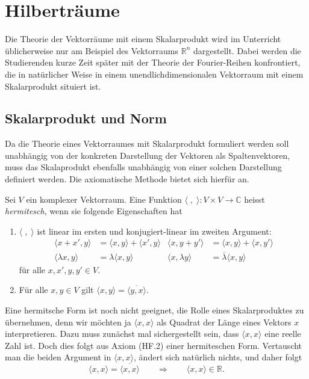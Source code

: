 %
%
%
\chapter{Hilberträume
\label{chapter:hilbertspaces}}
\rhead{}
Die Theorie der Vektorräume mit einem Skalarprodukt wird im Unterricht
üblicherweise nur am Beispiel des Vektorraums $\mathbb R^n$ dargestellt.
Dabei werden die Studierenden kurze Zeit später mit der Theorie
der Fourier-Reihen konfrontiert, die in natürlicher Weise in einem
unendlichdimensionalen Vektorraum mit einem Skalarprodukt situiert ist.

\section{Skalarprodukt und Norm}
Da die Theorie eines Vektorraumes mit Skalarprodukt formuliert werden
soll unabhängig von der konkreten Darstellung der Vektoren als 
Spaltenvektoren, muss das Skalaprodukt ebenfalls unabhängig von einer
solchen Darstellung definiert werden.
Die axiomatische Methode bietet sich hierfür an.

\begin{definition}
\label{hilbert:hermitescheform}
Sei $V$ ein komplexer Vektorraum.
Eine Funktion $\langle\;,\;\rangle\colon V\times V\to\mathbb C$ heisst
{\em hermitesch}, wenn sie folgende Eigenschaften hat
\begin{enumerate}[label={\bf HF.\arabic*},itemsep=0mm]
\item $\langle\;,\;\rangle$ ist linear im ersten und konjugiert-linear
im zweiten Argument:
\begin{align*}
\langle x+x',y\rangle &=\langle x,y\rangle + \langle x',y\rangle
&
\langle x,y+y'\rangle &=\langle x,y\rangle + \langle x,y'\rangle
\\
\langle\lambda x,y\rangle&=\lambda\langle x,y\rangle
&
\langle x,\lambda y\rangle&=\overline\lambda\langle x,y\rangle
\end{align*}
für alle $x,x',y,y'\in V$.
\item Für alle $x,y\in V$ gilt
$\langle x,y\rangle=\overline{\langle y,x\rangle}$.
\end{enumerate}
\end{definition}
Eine hermitsche Form ist noch nicht geeignet, die Rolle eines
Skalarproduktes zu übernehmen, denn wir möchten ja $\langle x,x\rangle$
als Quadrat der Länge eines Vektors $x$ interpretieren.
Dazu muss zunächst mal sichergestellt sein, dass $\langle x,x\rangle$
eine reelle Zahl ist.
Doch dies folgt aus Axiom (HF.2) einer hermiteschen Form.
Vertauscht man die beiden Argument in $\langle x,x\rangle$, ändert
sich natürlich nichts, und daher folgt
\[
\langle x,x\rangle = \overline{\langle x,x\rangle}
\qquad\Rightarrow\qquad
\langle x,x\rangle\in\mathbb R.
\]

